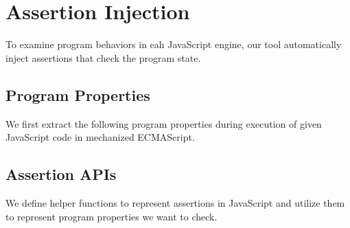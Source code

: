 \section{Assertion Injection}\label{sec:injection}

To examine program behaviors in eah JavaScript engine, our tool automatically
inject assertions that check the program state.


\subsection{Program Properties}

We first extract the following program properties during execution of given
JavaScript code in mechanized ECMAScript.


\subsection{Assertion APIs}

We define helper functions to represent assertions in JavaScript and utilize
them to represent program properties we want to check.

